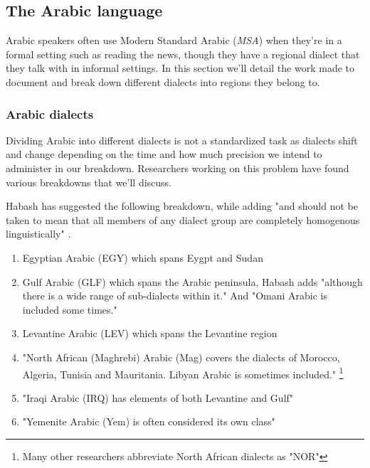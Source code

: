 \documentclass[12pt]{diazessay}
\begin{document}
    
    \subsection{The Arabic language} \label{txt:thearabiclanguage}
    Arabic speakers often use Modern Standard Arabic (\emph{MSA}) when they're in a formal setting such as reading the news, though they have a regional dialect that they talk with in informal settings. In this section we'll detail the work made to document and break down different dialects into regions they belong to. 
        
        
        \subsubsection{Arabic dialects}
        Dividing Arabic into different dialects is not a standardized task as dialects shift and change depending on the time and how much precision we intend to administer in our breakdown. Researchers working on this problem have found various breakdowns that we'll discuss.
        
        Habash has suggested the following breakdown, while adding "and should not be taken to mean that all members of any dialect group are completely homogenous linguistically" \cite{habash}.
        \begin{enumerate}
            \item Egyptian Arabic (EGY) which spans Eygpt and Sudan
            \item  Gulf Arabic (GLF) which spans the Arabic peninsula, Habash adds "although there is a wide range of sub-dialects within it." And "Omani Arabic is included some times."
            \item Levantine Arabic (LEV) which spans the Levantine region
            \item "North African (Maghrebi) Arabic (Mag) covers the dialects of Morocco, Algeria, Tunisia and Mauritania. Libyan Arabic is sometimes included." \footnote{Many other researchers abbreviate North African dialects as "NOR"}
            \item "Iraqi Arabic (IRQ) has elements of both Levantine and Gulf"
            \item "Yemenite Arabic (Yem) is often considered its own class"
        \end{enumerate}
        
\end{document}

